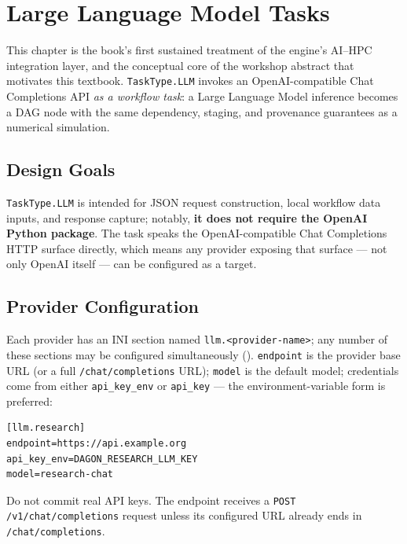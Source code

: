 \chapter{Large Language Model Tasks}
\label{ch:llm-tasks}

This chapter is the book's first sustained treatment of the engine's
AI--HPC integration layer, and the conceptual core of the workshop abstract
that motivates this textbook. \texttt{TaskType.LLM} invokes an
OpenAI-compatible Chat Completions API \emph{as a workflow task}: a Large
Language Model inference becomes a DAG node with the same dependency,
staging, and provenance guarantees as a numerical simulation.

\section{Design Goals}

\texttt{TaskType.LLM} is intended for JSON request construction, local
workflow data inputs, and response capture; notably, \textbf{it does not
require the OpenAI Python package}. The task speaks the OpenAI-compatible
Chat Completions HTTP surface directly, which means any provider exposing
that surface --- not only OpenAI itself --- can be configured as a target.

\section{Provider Configuration}

Each provider has an INI section named \texttt{llm.<provider-name>}; any
number of these sections may be configured simultaneously
(). \texttt{endpoint} is the provider base URL (or a
full \texttt{/chat/completions} URL); \texttt{model} is the default model;
credentials come from either \texttt{api\_key\_env} or \texttt{api\_key} ---
the environment-variable form is preferred:

\begin{lstlisting}[style=ini]
[llm.research]
endpoint=https://api.example.org
api_key_env=DAGON_RESEARCH_LLM_KEY
model=research-chat
\end{lstlisting}

\begin{cautionbox}
Do not commit real API keys. The endpoint receives a \texttt{POST
/v1/chat/completions} request unless its configured URL already ends in
\texttt{/chat/completions}.
\end{cautionbox}

